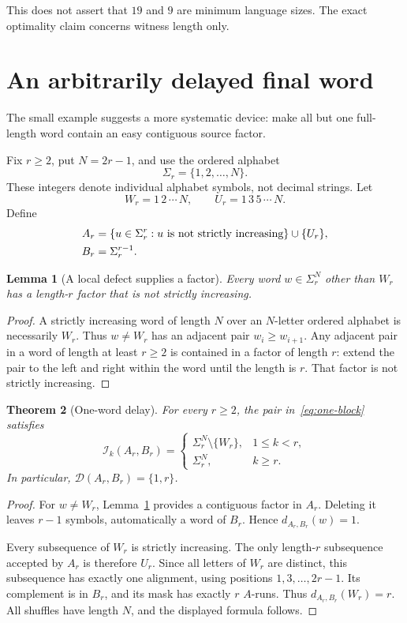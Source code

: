\documentclass[11pt,letterpaper]{article}
\newtheorem{theorem}{Theorem}[section]
\newtheorem{lemma}[theorem]{Lemma}
\theoremstyle{definition}\newtheorem{definition}[theorem]{Definition}
\theoremstyle{remark}\newtheorem{remark}[theorem]{Remark}
\theoremstyle{definition}\newtheorem{question}[theorem]{Question}
\newcommand{\ins}[3]{\mathcal I_{#1}(#2,#3)}
\newcommand{\spec}[2]{\mathcal D(#1,#2)}
\begin{document}
This does not assert that $19$ and $9$ are minimum language sizes. The exact optimality claim concerns witness length only.

\section{An arbitrarily delayed final word}\label{sec:delay}

The small example suggests a more systematic device: make all but one full-length word contain an easy contiguous source factor.

Fix $r\geq2$, put $N=2r-1$, and use the ordered alphabet
\[
 \Sigma_r=\{1,2,\ldots,N\}.
\]
These integers denote individual alphabet symbols, not decimal strings. Let
\[
 W_r=1\,2\,\cdots\,N,
 \qquad U_r=1\,3\,5\,\cdots\,N.
\]
Define
\begin{align}
  A_r&=\{u\in\Sigma_r^r:u\text{ is not strictly increasing}\}\cup\{U_r\},\notag\\
 B_r&=\Sigma_r^{r-1}.
 \label{eq:one-block}
\end{align}

\begin{lemma}[A local defect supplies a factor]\label{lem:defect}
Every word $w\in\Sigma_r^N$ other than $W_r$ has a length-$r$ factor that is not strictly increasing.
\end{lemma}
\begin{proof}
A strictly increasing word of length $N$ over an $N$-letter ordered alphabet is necessarily $W_r$. Thus $w\neq W_r$ has an adjacent pair $w_i\geq w_{i+1}$. Any adjacent pair in a word of length at least $r\geq2$ is contained in a factor of length $r$: extend the pair to the left and right within the word until the length is $r$. That factor is not strictly increasing.
\end{proof}

\begin{theorem}[One-word delay]\label{thm:delay}
For every $r\geq2$, the pair in~\eqref{eq:one-block} satisfies
\begin{equation}
 \ins{k}{A_r}{B_r}=
 \begin{cases}
  \Sigma_r^N\setminus\{W_r\},&1\leq k<r,\\
  \Sigma_r^N,&k\geq r.
 \end{cases}
 \label{eq:delay}
\end{equation}
In particular, $\spec{A_r}{B_r}=\{1,r\}$.
\end{theorem}
\begin{proof}
For $w\neq W_r$, Lemma~\ref{lem:defect} provides a contiguous factor in $A_r$. Deleting it leaves $r-1$ symbols, automatically a word of $B_r$. Hence $d_{A_r,B_r}(w)=1$.

Every subsequence of $W_r$ is strictly increasing. The only length-$r$ subsequence accepted by $A_r$ is therefore $U_r$. Since all letters of $W_r$ are distinct, this subsequence has exactly one alignment, using positions $1,3,\ldots,2r-1$. Its complement is in $B_r$, and its mask has exactly $r$ $A$-runs. Thus $d_{A_r,B_r}(W_r)=r$. All shuffles have length $N$, and the displayed formula follows.
\end{proof}
\end{document}
